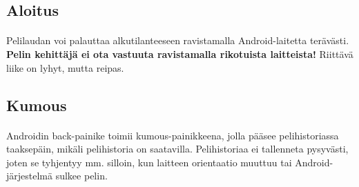 \documentclass[11pt]{article}
\begin{document}
\subsection{Aloitus}

\paragraph{} Pelilaudan voi palauttaa alkutilanteeseen ravistamalla Android-laitetta terävästi. \textbf{Pelin kehittäjä ei ota vastuuta ravistamalla rikotuista laitteista!} Riittävä liike on lyhyt, mutta reipas.

\subsection{Kumous}

\paragraph{} Androidin back-painike toimii kumous-painikkeena, jolla pääsee pelihistoriassa taaksepäin, mikäli pelihistoria on saatavilla. Pelihistoriaa ei tallenneta pysyvästi, joten se tyhjentyy mm. silloin, kun laitteen orientaatio muuttuu tai Android-järjestelmä sulkee pelin.
\end{document}
